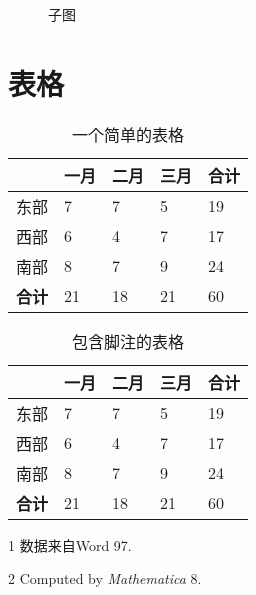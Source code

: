         \begin{figure}[h!]
          \centering
          \caption{子图}
        \end{figure}
          

    \section{表格}

        \begin{table}[h!]
          \centering
          \caption{一个简单的表格}
          \label{tab:simple}
          \wuhao
          \begin{tabularx}{\linewidth}{XXXXX} \toprule 
                & 一月 & 二月 & 三月 & 合计 \\ \midrule
           东部 &    7 &    7 &    5 &   19 \\ 
           西部 &    6 &    4 &    7 &   17 \\ 
           南部 &    8 &    7 &    9 &   24 \\ 
       \bf 合计 &   21 &   18 &   21 &   60 \\ \bottomrule
          \end{tabularx}
        \end{table}


        \begin{table}[h!]
          \begin{threeparttable}[h]
            \centering
            \caption{包含脚注的表格}
            \label{tab:with-footnote}
            \wuhao
            \begin{tabularx}{\linewidth}{XXXXX} \toprule 
                  & 一月 & 二月 & 三月 & 合计 \\ \midrule
                  东部 &    7\tnote{1}
                                &    7 &    5 &   19 \\ 
             西部 &    6 &    4 &    7 &   17 \\ 
             南部 &    8 &    7 &    9 &   24 \\ 
             \bf 合计\tnote{2}
                  &   21 &   18 &   21 &   60 \\ \bottomrule
            \end{tabularx}
          \begin{tablenotes}
          \item[1] 数据来自Word 97.
          \item[2] Computed by \textsl{Mathematica} 8.
          \end{tablenotes}
          \end{threeparttable}
        \end{table}

